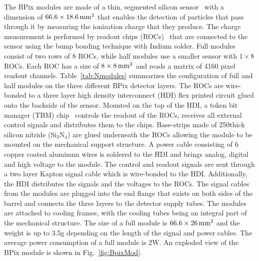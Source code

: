 The BPix modules are made of a thin, segmented silicon sensor~\cite{Allkofer200825} with a dimension of $66.6\times18.6\,\text{mm}^2$ that enables the detection of particles that pass through it by measuring the ionization charge that they produce.
The charge measurement is performed by readout chips (ROCs)~\cite{Kastli:2005jj} that are connected to the sensor using the bump bonding technique with Indium solder.
Full modules consist of two rows of 8 ROCs, while half modules use a smaller sensor with $1\times8$ ROCs.
Each ROC has a size of $8\times8\,\text{mm}^2$ and reads a matrix of 4160 pixel readout channels.
Table~\ref{tab:Nmodules} summarizes the configuration of full and half modules on the three different BPix detector layers.
The ROCs are wire-bonded to a three layer high density interconnect (HDI) flex printed circuit glued onto the backside of the sensor.
Mounted on the top of the HDI, a token bit manager (TBM) chip~\cite{Bartz:920426} controls the readout of the ROCs, receives all external control signals and distributes them to the chips.
Base-strips made of 250\mum thick silicon nitride (Si$_3$N$_4$) are glued underneath the ROCs allowing the module to be mounted on the mechanical support structure.
A power cable consisting of 6 copper coated aluminum wires is soldered to the HDI and brings analog, digital and high voltage to the module.
The control and readout signals are sent through a two layer Kapton signal cable which is wire-bonded to the HDI.
Additionally, the HDI distributes the signals and the voltages to the ROCs.
The signal cables from the modules are plugged into the end flange that exists on both sides of the barrel and connects the three layers to the detector supply tubes. 
The modules are attached to cooling frames, with the cooling tubes being an integral part of the mechanical structure.
The size of a full module is $66.6\times26\,\text{mm}^2$ and the weight is up to 3.5\unit{g} depending on the length of the signal and power cables.
The average power consumption of a full module is 2\unit{W}. An exploded view of the BPix module is shown in Fig.~\ref{fig:BpixMod}.


